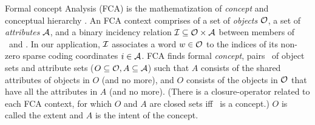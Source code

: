 \documentclass[11pt,a4paper]{article}
\begin{document}
Formal concept Analysis (FCA) is the mathematization of \emph{concept} and conceptual
hierarchy \citep{Ganter:2012,Endres:2010}. %
An FCA context %
comprises of
a set of \emph{objects} $\mathcal O$, a set of \emph{attributes} $\mathcal A$, and
a binary incidency relation $\mathcal I \subseteq \mathcal O \times \mathcal A$
between members of \ob~and \at.
In our application, $\mathcal I$ associates a word $w\in\mathcal O$ to 
the indices of its non-zero sparse coding coordinates $i\in\mathcal A$.
FCA finds formal \emph{concept}, pairs \oaconc~of object sets and attribute sets
($O\subseteq \mathcal O,A \subseteq \mathcal A$) such that $A$
consists of the shared attributes of objects in $O$ (and no more), and
$O$ consists of
the objects in $\mathcal O$ that have all the attributes in $A$ (and no more).
(There is a closure-operator related to each FCA context, for which $O$ and $A$
are closed sets iff \oaconc~is a concept.)
$O$ is called the extent and $A$ is the intent of the concept.
\end{document}
